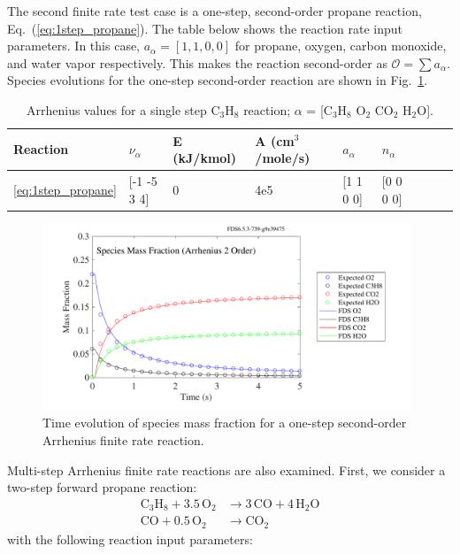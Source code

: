 \documentclass[11pt]{book}
\begin{document}
The second finite rate test case is a one-step, second-order propane reaction, Eq.~(\ref{eq:1step_propane}). The table below shows the reaction rate input parameters. In this case, $a_{\alpha}=[1,1,0,0]$  for propane, oxygen, carbon monoxide, and water vapor respectively. This makes the reaction second-order as $\mathcal{O}=\sum a_{\alpha}$. Species evolutions for the one-step second-order reaction are shown in Fig.~\ref{fig:Arrhenius_2Order_1step}.
\begin{table}[ht]
\begin{center}
\caption[Arrhenius values for a single step C$_3$H$_8$ reaction]{Arrhenius values for a single step C$_3$H$_8$ reaction; $\alpha$ = [$\mathrm{C_3H_8}$ $\mathrm{O_2}$ $\mathrm{CO_2}$ $\mathrm{H_2O}$].}
\label{single_step_c3h8}
\begin{tabular}{|l|l|l|l|l|l|l|l|l|}
\hline Reaction & $\nu_{\alpha}$ & E (kJ/kmol) & A (cm$^3$/mole/s) & $a_{\alpha}$ & $n_{\alpha}$  \\ \hline \hline
\ref{eq:1step_propane} & [-1 -5 3 4] & 0 & 4e5 & [1 1 0 0] & [0 0 0 0] \\ \hline
\end{tabular}
\end{center}
\end{table}
\begin{figure}[h!]
\centering
\includegraphics[height=2.2in]{SCRIPT_FIGURES/reactionrate_arrhenius_2order_1step}
\caption[Species evolution in a 2-order 1-step finite rate reaction]{Time evolution of species mass fraction for a one-step second-order Arrhenius finite rate reaction.}
\label{fig:Arrhenius_2Order_1step}
\end{figure}
Multi-step Arrhenius finite rate reactions are also examined. First, we consider a two-step forward propane reaction:
\begin{subequations}
\begin{align}
\label{eq:2step_propane_a}
\mathrm{C_3H_8+3.5 \, O_2} &\rightarrow  \mathrm{3 \, CO + 4 \, H_2O} \\
\label{eq:2step_propane_b}
\mathrm{CO+0.5 \, O_2} &\rightarrow \mathrm{CO_2}
\end{align}
\end{subequations}
with the following reaction input parameters:
\end{document}
